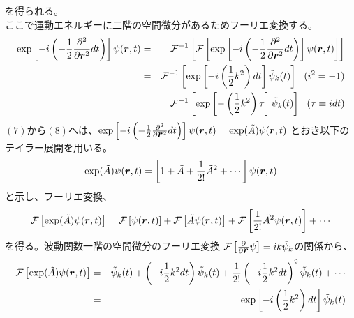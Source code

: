 \documentclass[12pt,a4paper]{jbook}
\def\Vec#1{\mbox{\boldmath $#1$}}			%
\begin{document}
            を得られる。
            \\
            ここで運動エネルギーに二階の空間微分があるためフーリエ変換する。
            \begin{eqnarray}
                \exp \left[ -i \left( -\frac{1}{2} \frac{\partial^2}{\partial \Vec{r}^2} dt \right)
                    \right] \psi(\Vec{r}, t)
                & = & {\cal F}^{-1} \left[ 
                    {\cal F} \left[
                        \exp \left[
                            -i \left( -\frac{1}{2} \frac{\partial^2}{\partial \Vec{r}^2} dt \right)
                        \right]
                        \psi(\Vec{r}, t)
                    \right]
                \right]
                \\
                & = & {\cal F}^{-1} \left[
                    \exp \left[
                        -i \left( \frac{1}{2} k^2 \right) dt
                    \right]
                    \tilde{\psi}_k (t)
                \right] \ \ ( i^2 = -1 )
                \\
                & = & {\cal F}^{-1} \left[
                    \exp \left[
                        - \left( \frac{1}{2} k^2 \right) \tau
                    \right]
                    \tilde{\psi}_k (t)
                \right] \ \ (\tau \equiv i dt)
            \end{eqnarray}
            $(7)$から$(8)$へは、$\exp \left[ -i \left( -\frac{1}{2} \frac{\partial^2}{\partial \Vec{r}^2} dt\right) \right]
            \psi(\Vec{r},t) = \exp ( \tilde{A} ) \psi(\Vec{r},t)$
            とおき以下のテイラー展開を用いる。
            \begin{eqnarray}
                \exp ( \tilde{A} ) \psi(\Vec{r}, t) =
                \left[ 1 + \tilde{A} + \frac{1}{2!} \tilde{A}^2 + \cdots \right] \psi(\Vec{r},t)
            \end{eqnarray}
            と示し、フーリエ変換、
            \begin{eqnarray}
                {\cal F} \left[ \exp ( \tilde{A} ) \psi(\Vec{r},t) \right] = 
                {\cal F} \left[ \psi(\Vec{r},t) \right]
                + {\cal F} \left[ \tilde{A} \psi(\Vec{r}, t) \right]
                + {\cal F} \left[ \frac{1}{2!} \tilde{A}^2 \psi(\Vec{r},t) \right]
                + \cdots
            \end{eqnarray}
            を得る。波動関数一階の空間微分のフーリエ変換
            ${\cal F} \left[ \frac{\partial}{\partial \Vec{r}} \psi \right]=i k \tilde{\psi}_k$の関係から、
            \begin{eqnarray}
                {\cal F} \left[ \exp ( \tilde{A} ) \psi(\Vec{r},t) \right]
                & = &
                \tilde{\psi}_k (t) + \left( -i \frac{1}{2} k^2 dt \right) \tilde{\psi}_k (t)
                + \frac{1}{2!} \left( -i \frac{1}{2} k^2 dt \right)^2 \tilde{\psi}_k (t)
                + \cdots
                \\
                & = & \exp \left[ -i \left( \frac{1}{2} k^2 \right) dt \right] \tilde{\psi}_k (t)
            \end{eqnarray}
\end{document}
